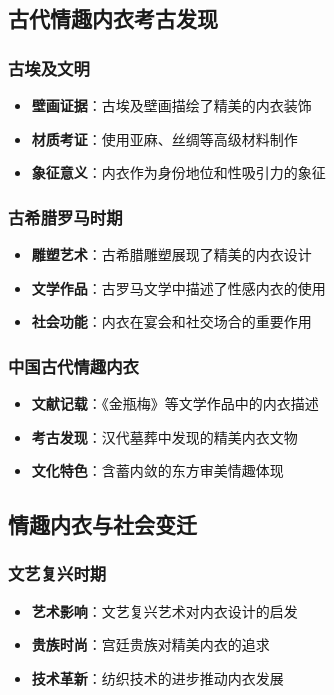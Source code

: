 \documentclass[12pt,UTF8]{ctexbook}
\begin{document}
\subsection{古代情趣内衣考古发现}
\subsubsection{古埃及文明}
\begin{itemize}[leftmargin=2cm]
	\item \textbf{壁画证据}：古埃及壁画描绘了精美的内衣装饰
	\item \textbf{材质考证}：使用亚麻、丝绸等高级材料制作
	\item \textbf{象征意义}：内衣作为身份地位和性吸引力的象征
\end{itemize}

\subsubsection{古希腊罗马时期}
\begin{itemize}[leftmargin=2cm]
	\item \textbf{雕塑艺术}：古希腊雕塑展现了精美的内衣设计
	\item \textbf{文学作品}：古罗马文学中描述了性感内衣的使用
	\item \textbf{社会功能}：内衣在宴会和社交场合的重要作用
\end{itemize}

\subsubsection{中国古代情趣内衣}
\begin{itemize}[leftmargin=2cm]
	\item \textbf{文献记载}：《金瓶梅》等文学作品中的内衣描述
	\item \textbf{考古发现}：汉代墓葬中发现的精美内衣文物
	\item \textbf{文化特色}：含蓄内敛的东方审美情趣体现
\end{itemize}

\subsection{情趣内衣与社会变迁}
\subsubsection{文艺复兴时期}
\begin{itemize}[leftmargin=2cm]
	\item \textbf{艺术影响}：文艺复兴艺术对内衣设计的启发
	\item \textbf{贵族时尚}：宫廷贵族对精美内衣的追求
	\item \textbf{技术革新}：纺织技术的进步推动内衣发展
\end{itemize}
\end{document}
